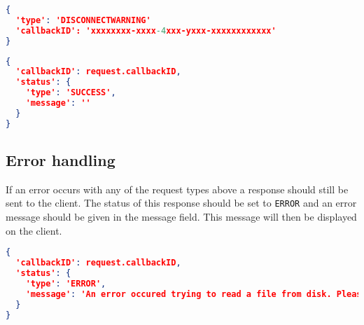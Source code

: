 \documentclass[A4,12pt, utf8]{article}
\begin{document}
\begin{lstlisting}[caption=Request content, language=json]
{
  'type': 'DISCONNECTWARNING'
  'callbackID': 'xxxxxxxx-xxxx-4xxx-yxxx-xxxxxxxxxxxx'
}
\end{lstlisting}

\begin{lstlisting}[caption=response content, language=json]
{
  'callbackID': request.callbackID,
  'status': {
    'type': 'SUCCESS',
    'message': ''
  }
}
\end{lstlisting}



\subsection{Error handling}

If an error occurs with any of the request types above a response should still be sent to the client. The status of this response should be set to \texttt{ERROR} and an error message should be given in the message field. This message will then be displayed on the client.

\begin{lstlisting}[caption=ERROR response content, language=json]
{
  'callbackID': request.callbackID,
  'status': {
    'type': 'ERROR',
    'message': 'An error occured trying to read a file from disk. Please make sure: /path/to/file exists or check the config...
  }
}
\end{lstlisting}
\end{document}

